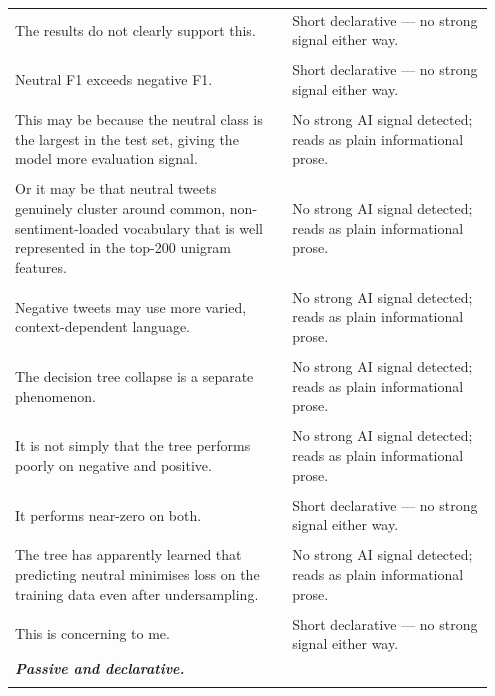 \documentclass[11pt]{article}
\begin{document}
\begin{longtable}{|p{0.55\linewidth}|p{0.40\linewidth}|}
\hline
\rule{0pt}{3.5cm} & \\
\hline
The results do not clearly support this. & Short declarative --- no strong signal either way. \\[2pt]
\hline
\rule{0pt}{3.5cm} & \\
\hline
Neutral F1 exceeds negative F1. & Short declarative --- no strong signal either way. \\[2pt]
\hline
\rule{0pt}{3.5cm} & \\
\hline
This may be because the neutral class is the largest in the test set, giving the model more evaluation signal. & No strong AI signal detected; reads as plain informational prose. \\[2pt]
\hline
\rule{0pt}{3.5cm} & \\
\hline
Or it may be that neutral tweets genuinely cluster around common, non-sentiment-loaded vocabulary that is well represented in the top-200 unigram features. & No strong AI signal detected; reads as plain informational prose. \\[2pt]
\hline
\rule{0pt}{3.5cm} & \\
\hline
Negative tweets may use more varied, context-dependent language. & No strong AI signal detected; reads as plain informational prose. \\[2pt]
\hline
\rule{0pt}{3.5cm} & \\
\hline
The decision tree collapse is a separate phenomenon. & No strong AI signal detected; reads as plain informational prose. \\[2pt]
\hline
\rule{0pt}{3.5cm} & \\
\hline
It is not simply that the tree performs poorly on negative and positive. & No strong AI signal detected; reads as plain informational prose. \\[2pt]
\hline
\rule{0pt}{3.5cm} & \\
\hline
It performs near-zero on both. & Short declarative --- no strong signal either way. \\[2pt]
\hline
\rule{0pt}{3.5cm} & \\
\hline
The tree has apparently learned that predicting neutral minimises loss on the training data even after undersampling. & No strong AI signal detected; reads as plain informational prose. \\[2pt]
\hline
\rule{0pt}{3.5cm} & \\
\hline
This is concerning to me. & Short declarative --- no strong signal either way. \\[2pt]
\hline
\textbf{\textit{Passive and declarative.}}\\[2em] & \\

\end{longtable}
\end{document}
